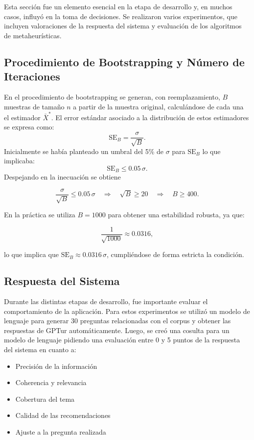 \documentclass[10pt]{llncs}
\begin{document}




\vspace{\baselineskip}



Esta sección fue un elemento esencial en la etapa de desarrollo y, en muchos casos, influyó en la toma de decisiones. Se realizaron varios experimentos, que incluyen valoraciones de la respuesta del sistema y evaluación de los algoritmos de metaheurísticas.
\subsection{Procedimiento de Bootstrapping y Número de Iteraciones}

En el procedimiento de bootstrapping se generan, con reemplazamiento, $B$ muestras de tamaño $n$ a partir de la muestra original, calculándose de cada una el estimador $\bar{X}^*$.
El error estándar asociado a la distribución de estos estimadores se expresa como:
\begin{equation}
\text{SE}_B = \frac{\sigma}{\sqrt{B}}.
\end{equation}
Inicialmente se había planteado un umbral del 5\% de $\sigma$ para $\text{SE}_B$ lo que implicaba:
\begin{equation}
\text{SE}_B \leq 0.05\,\sigma.
\end{equation}
Despejando en la inecuación se obtiene


\[
\frac{\sigma}{\sqrt{B}} \leq 0.05\,\sigma \quad \Longrightarrow \quad \sqrt{B} \geq 20 \quad \Longrightarrow \quad B \geq 400.
\]


En la práctica se utiliza $B=1000$ para obtener una estabilidad robusta, ya que:


\[
\frac{1}{\sqrt{1000}} \approx 0.0316,
\]


lo que implica que $\text{SE}_B\approx 0.0316\,\sigma$, cumpliéndose de forma estricta la condición.

\vspace{\baselineskip}
\subsection{Respuesta del Sistema}

Durante las distintas etapas de desarrollo, fue importante evaluar el comportamiento de la aplicación. Para estos experimentos se utilizó un modelo de lenguaje para generar 30 preguntas relacionadas con el corpus y obtener las respuestas de GPTur automáticamente. Luego, 
se creó una cosulta para un modelo de lenguaje pidiendo una evaluación entre 0 y 5 puntos de la respuesta del sistema en cuanto a:
\begin{itemize}
    \item  Precisión de la información
    \item Coherencia y relevancia
    \item Cobertura del tema
    \item Calidad de las recomendaciones
    \item Ajuste a la pregunta realizada
\end{itemize}
\end{document}
